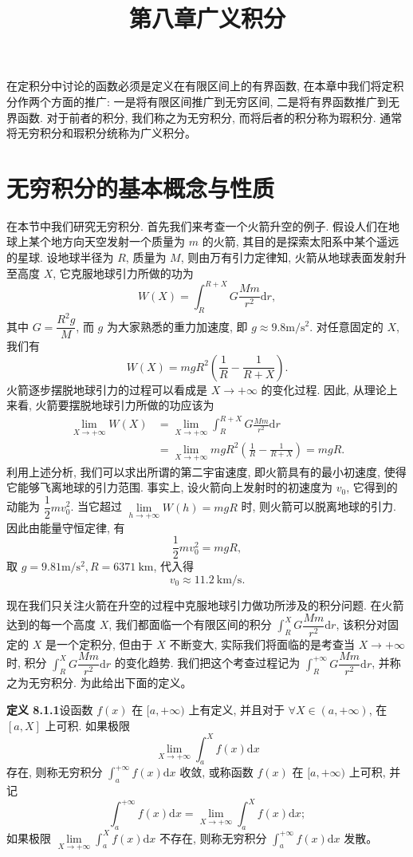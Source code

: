\documentclass[UTF8,12pt,a4paper,fontset=fandol]{ctexart}
\title{第八章\quad 广义积分}
\author{}
\date{}
\begin{document}
\maketitle

在定积分中讨论的函数必须是定义在有限区间上的有界函数, 在本章中我们将定积分作两个方面的推广: 一是将有限区间推广到无穷区间, 二是将有界函数推广到无界函数. 对于前者的积分, 我们称之为无穷积分, 而将后者的积分称为瑕积分. 通常将无穷积分和瑕积分统称为广义积分。

\section{无穷积分的基本概念与性质}

在本节中我们研究无穷积分. 首先我们来考查一个火箭升空的例子. 假设人们在地球上某个地方向天空发射一个质量为 $m$ 的火箭, 其目的是探索太阳系中某个遥远的星球. 设地球半径为 $R$, 质量为 $M$, 则由万有引力定律知, 火箭从地球表面发射升至高度 $X$, 它克服地球引力所做的功为
\[
  W(X)=\int_R^{R+X}G\frac{Mm}{r^2}\mathrm dr,
\]
其中 $G=\dfrac{R^2g}{M}$, 而 $g$ 为大家熟悉的重力加速度, 即 $g\approx9.8\mathrm{m}/\mathrm{s}^2$. 对任意固定的 $X$, 我们有
\[
  W(X)=mgR^2\left(\frac1R-\frac1{R+X}\right).
\]
火箭逐步摆脱地球引力的过程可以看成是 $X\to+\infty$ 的变化过程. 因此, 从理论上来看, 火箭要摆脱地球引力所做的功应该为
\[
\begin{aligned}
  \lim_{X\to+\infty}W(X)
  &=\lim_{X\to+\infty}\int_R^{R+X}G\frac{Mm}{r^2}\mathrm dr\\
  &=\lim_{X\to+\infty}mgR^2\left(\frac1R-\frac1{R+X}\right)=mgR.
\end{aligned}
\]
利用上述分析, 我们可以求出所谓的第二宇宙速度, 即火箭具有的最小初速度, 使得它能够飞离地球的引力范围. 事实上, 设火箭向上发射时的初速度为 $v_0$, 它得到的动能为 $\dfrac12mv_0^2$. 当它超过 $\lim\limits_{h\to+\infty}W(h)=mgR$ 时, 则火箭可以脱离地球的引力. 因此由能量守恒定律, 有
\[
  \frac12mv_0^2=mgR,
\]
取 $g=9.81\mathrm{m}/\mathrm{s}^2,R=6371\ \mathrm{km}$, 代入得
\[
  v_0\approx11.2\ \mathrm{km}/\mathrm{s}.
\]

现在我们只关注火箭在升空的过程中克服地球引力做功所涉及的积分问题. 在火箭达到的每一个高度 $X$, 我们都面临一个有限区间的积分 $\int_R^X G\dfrac{Mm}{r^2}\mathrm dr$, 该积分对固定的 $X$ 是一个定积分, 但由于 $X$ 不断变大, 实际我们将面临的是考查当 $X\to+\infty$ 时, 积分 $\int_R^X G\dfrac{Mm}{r^2}\mathrm dr$ 的变化趋势. 我们把这个考查过程记为 $\int_R^{+\infty}G\dfrac{Mm}{r^2}\mathrm dr$, 并称之为无穷积分. 为此给出下面的定义。

\noindent\textbf{定义 8.1.1}\quad 设函数 $f(x)$ 在 $[a,+\infty)$ 上有定义, 并且对于 $\forall X\in(a,+\infty)$, 在 $[a,X]$ 上可积. 如果极限
\[
  \lim_{X\to+\infty}\int_a^X f(x)\mathrm dx
\]
存在, 则称无穷积分 $\int_a^{+\infty}f(x)\mathrm dx$ 收敛, 或称函数 $f(x)$ 在 $[a,+\infty)$ 上可积, 并记
\[
  \int_a^{+\infty}f(x)\mathrm dx=\lim_{X\to+\infty}\int_a^X f(x)\mathrm dx;
\]
如果极限 $\lim\limits_{X\to+\infty}\int_a^X f(x)\mathrm dx$ 不存在, 则称无穷积分 $\int_a^{+\infty}f(x)\mathrm dx$ 发散。
\end{document}
